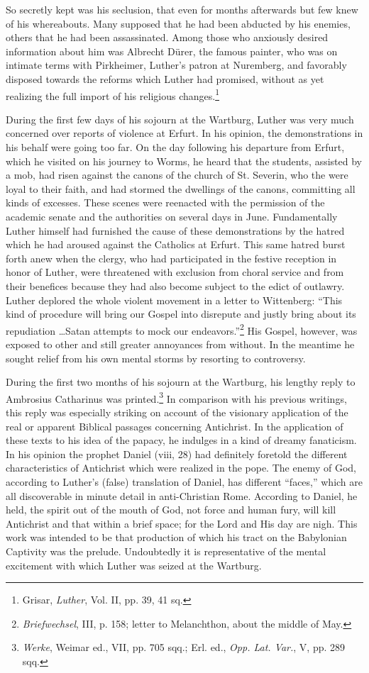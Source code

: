 So secretly kept was his seclusion, that even for months afterwards
but few knew of his whereabouts. Many supposed that he had been
abducted by his enemies, others that he had been assassinated. Among
those who anxiously desired information about him was Albrecht
Dürer, the famous painter, who was on intimate terms with Pirkheimer,
Luther’s patron at Nuremberg, and favorably disposed
towards the reforms which Luther had promised, without as yet
realizing the full import of his religious changes.\footnote{Grisar, \textit{Luther}, Vol. II, pp. 39, 41 sq.}

During the first few days of his sojourn at the Wartburg, Luther
was very much concerned over reports of violence at Erfurt. In
his opinion, the demonstrations in his behalf were going too far. On
the day following his departure from Erfurt, which he visited on
his journey to Worms, he heard that the students, assisted by a mob,
had risen against the canons of the church of St. Severin, who
the were loyal to their faith, and had stormed the dwellings of the
canons, committing all kinds of excesses. These scenes were reenacted
with the permission of the academic senate and the authorities on
several days in June. Fundamentally Luther himself had furnished
the cause of these demonstrations by the hatred which he had
aroused against the Catholics at Erfurt. This same hatred burst
forth anew when the clergy, who had participated in the festive
reception in honor of Luther, were threatened with exclusion from
choral service and from their benefices because they had also become
subject to the edict of outlawry. Luther deplored the whole violent
movement in a letter to Wittenberg: “This kind of procedure will
bring our Gospel into disrepute and justly bring about its repudiation
\dots Satan attempts to mock our endeavors.”\footnote{\textit{Briefwechsel}, III, p. 158; letter to Melanchthon, about the middle of May.}
His Gospel,
however, was exposed to other and still greater annoyances from
without. In the meantime he sought relief from his own mental
storms by resorting to controversy.

During the first two months of his sojourn at the Wartburg, his
lengthy reply to Ambrosius Catharinus was printed.\footnote{\textit{Werke}, Weimar ed., VII, pp. 705 sqq.; Erl. ed., \textit{Opp. Lat. Var.}, V, pp. 289 sqq.}
In comparison
with his previous writings, this reply was especially striking on account
of the visionary application of the real or apparent Biblical
passages concerning Antichrist. In the application of these texts
to his idea of the papacy, he indulges in a kind of dreamy fanaticism.
In his opinion the prophet Daniel (viii, 28) had definitely foretold
the different characteristics of Antichrist which were realized in
the pope. The enemy of God, according to Luther’s (false) translation of
Daniel, has different “faces,” which are all discoverable in
minute detail in anti-Christian Rome. According to Daniel, he held,
the spirit out of the mouth of God, not force and human fury, will
kill Antichrist and that within a brief space; for the Lord and
His day are nigh. This work was intended to be that production of
which his tract on the Babylonian Captivity was the prelude. Undoubtedly
it is representative of the mental excitement with which
Luther was seized at the Wartburg.

